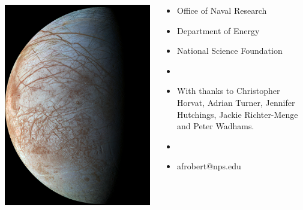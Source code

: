 \documentclass[aspectratio=169,11pt]{beamer}
\begin{document}
\begingroup
{}
\begin{frame}
\begin{columns} %
\begin{column}{0.3\textwidth}
\includegraphics[height=\textheight,keepaspectratio]{Figures/Europa.jpg}
\end{column}
\begin{column}{0.6\textwidth}
\begin{itemize}
	\item[] \color{white} \Large Office of Naval Research
	\item[] \color{white} \Large Department of Energy
	\item[] \color{white} \Large National Science Foundation
	\item[] ~
	\item[] \color{white} \scriptsize With thanks to Christopher Horvat, Adrian Turner, Jennifer Hutchings, Jackie Richter-Menge and Peter Wadhams. 
	\item[] ~
	\item[] \color{white} \Large afrobert@nps.edu
\end{itemize}
\end{column}
\end{columns}
\end{frame}
\endgroup




\end{document}
